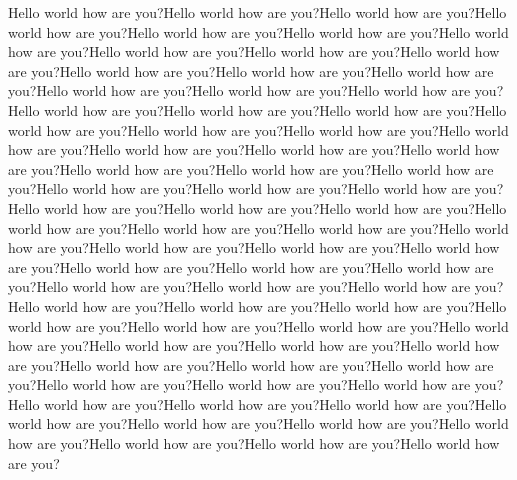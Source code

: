Hello world how are you?Hello world how are you?Hello world how are you?Hello world how are you?Hello world how are you?Hello world how are you?Hello world how are you?Hello world how are you?Hello world how are you?Hello world how are you?Hello world how are you?Hello world how are you?Hello world how are you?Hello world how are you?Hello world how are you?Hello world how are you?Hello world how are you?Hello world how are you?Hello world how are you?Hello world how are you?Hello world how are you?Hello world how are you?Hello world how are you?Hello world how are you?Hello world how are you?Hello world how are you?Hello world how are you?Hello world how are you?Hello world how are you?Hello world how are you?Hello world how are you?Hello world how are you?Hello world how are you?Hello world how are you?Hello world how are you?Hello world how are you?Hello world how are you?Hello world how are you?Hello world how are you?Hello world how are you?Hello world how are you?Hello world how are you?Hello world how are you?Hello world how are you?Hello world how are you?Hello world how are you?Hello world how are you?Hello world how are you?Hello world how are you?Hello world how are you?Hello world how are you?Hello world how are you?Hello world how are you?Hello world how are you?Hello world how are you?Hello world how are you?Hello world how are you?Hello world how are you?Hello world how are you?Hello world how are you?Hello world how are you?Hello world how are you?Hello world how are you?Hello world how are you?Hello world how are you?Hello world how are you?Hello world how are you?Hello world how are you?Hello world how are you?Hello world how are you?Hello world how are you?Hello world how are you?Hello world how are you?Hello world how are you?
